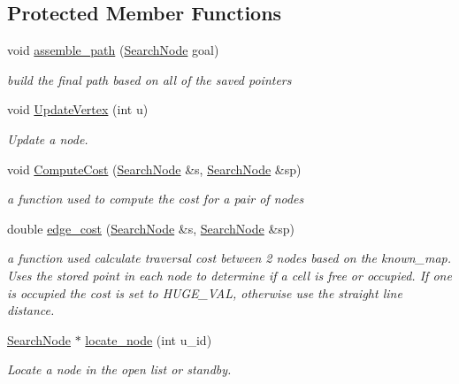 \subsection*{Protected Member Functions}
\begin{DoxyCompactItemize}
\item 
void \hyperlink{classhsearch_1_1LPAStar_aae9f9031efbe788a83f842905b63e2aa}{assemble\+\_\+path} (\hyperlink{structhsearch_1_1SearchNode}{Search\+Node} goal)
\begin{DoxyCompactList}\small\item\em build the final path based on all of the saved pointers \end{DoxyCompactList}\item 
void \hyperlink{classhsearch_1_1LPAStar_a41219de9a23ffe245589dc34a35e0639}{Update\+Vertex} (int u)
\begin{DoxyCompactList}\small\item\em Update a node. \end{DoxyCompactList}\item 
void \hyperlink{classhsearch_1_1LPAStar_aaeb55f7d05b4952247e492a7db18438d}{Compute\+Cost} (\hyperlink{structhsearch_1_1SearchNode}{Search\+Node} \&s, \hyperlink{structhsearch_1_1SearchNode}{Search\+Node} \&sp)
\begin{DoxyCompactList}\small\item\em a function used to compute the cost for a pair of nodes \end{DoxyCompactList}\item 
double \hyperlink{classhsearch_1_1LPAStar_a92e2fda4e5b1f8ab77297d8cd45e56a7}{edge\+\_\+cost} (\hyperlink{structhsearch_1_1SearchNode}{Search\+Node} \&s, \hyperlink{structhsearch_1_1SearchNode}{Search\+Node} \&sp)
\begin{DoxyCompactList}\small\item\em a function used calculate traversal cost between 2 nodes based on the known\+\_\+map. Uses the stored point in each node to determine if a cell is free or occupied. If one is occupied the cost is set to H\+U\+G\+E\+\_\+\+V\+AL, otherwise use the straight line distance. \end{DoxyCompactList}\item 
\hyperlink{structhsearch_1_1SearchNode}{Search\+Node} $\ast$ \hyperlink{classhsearch_1_1LPAStar_ad5b74c1a38d9db460324fcb1784ac114}{locate\+\_\+node} (int u\+\_\+id)
\begin{DoxyCompactList}\small\item\em Locate a node in the open list or standby. \end{DoxyCompactList}\item 

\end{DoxyCompactItemize}
